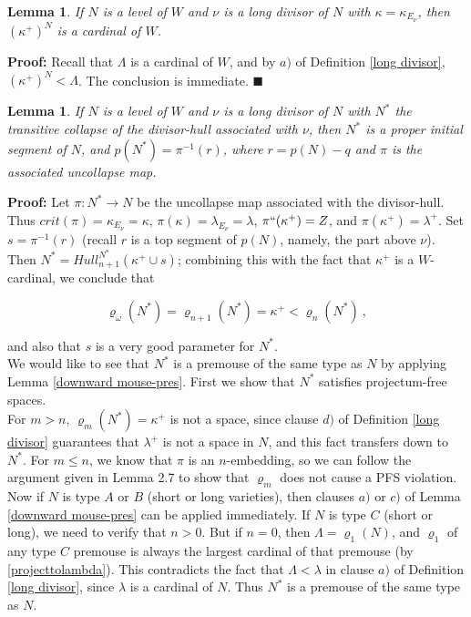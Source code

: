 \documentclass[12pt]{article}
\newtheorem{lem}[thm]{Lemma}
\begin{document}
\begin{lem}
If $N$ is a level of $W$ and $\nu$ is a long divisor of $N$ with $\kappa = \kappa_{E_\nu}$, then $(\kappa^+)^N$ is a cardinal of $W$.
\end{lem}

\textbf{Proof:} Recall that $\Lambda$ is a cardinal of $W$, and by $a)$ of Definition \ref{long divisor}, $(\kappa^+)^N < \Lambda$.  The conclusion is immediate. $\blacksquare$\\


\begin{lem} \label{long divisor hull condensation}
If $N$ is a level of $W$ and $\nu$ is a long divisor of $N$ with $N^*$ the transitive collapse of the divisor-hull associated with $\nu$, then $N^*$ is a proper initial segment of $N$, and $p (N^*) = \pi^{-1} (r)$, where $r = p(N) - q$ and $\pi$ is the associated uncollapse map.
\end{lem}

\textbf{Proof:}  Let $\pi: N^* \longrightarrow N$ be the uncollapse map associated with the divisor-hull.  Thus $crit(\pi) = \kappa_{E_\nu} = \kappa$, $\pi ( \kappa ) =\lambda_{E_\nu} = \lambda$, $\pi``(\kappa^+) = Z$, and $\pi ( \kappa^+ ) = \lambda^+$.  
Set $s = \pi^{-1} (r)$ (recall $r$ is a top segment of $p (N)$, namely, the part above $\nu$).  Then $N^* = Hull_{n+1}^{N^*} (\kappa^+ \cup s)$; combining this with the fact that $\kappa^+$ is a $W$-cardinal, we conclude that

\[
\varrho_\omega (N^*) = \varrho_{n + 1} (N^*) = \kappa^+ < \varrho_n (N^*) \ ,
\]

and also that $s$ is a very good parameter for $N^*$.\\

 We would like to see that $N^*$ is a premouse of the same type as $N$ by applying Lemma \ref{downward mouse-pres}.  First we show that $N^*$ satisfies projectum-free spaces.\\
 

 For $m > n$, $\varrho_m (N^*) = \kappa^+$ is not a space, since clause $d)$ of Definition \ref{long divisor} guarantees that $\lambda^+$ is not a space in $N$, and this fact transfers down to $N^*$.  For $m \leq n$, we know that $\pi$ is an $n$-embedding, so we can follow the argument given in Lemma 2.7 to show that $\varrho_m$ does not cause a PFS violation.\\

Now if $N$ is type $A$ or $B$ (short or long varieties), then clauses $a)$ or $c)$ of Lemma \ref{downward mouse-pres} can be applied immediately.  If $N$ is type $C$ (short or long), we need to verify that $n > 0$.  But if $n = 0$, then $\Lambda = \varrho_1 (N)$, and $\varrho_1$ of any type $C$ premouse is always the largest cardinal of that premouse (by \ref{projecttolambda}).  This contradicts the fact that $\Lambda < \lambda$ in clause $a)$ of Definition \ref{long divisor}, since $\lambda$ is a cardinal of $N$.  Thus $N^*$ is a premouse of the same type as $N$.\\
\end{document}
